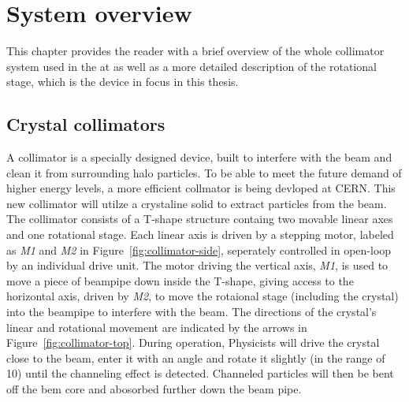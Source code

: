 \chapter{System overview}\label{cha:systemOverview}
This chapter provides the reader with a brief overview of the whole collimator system used in the \abbrLHC at \abbrCERN as well as a more detailed description of the rotational stage, which is the device in focus in this thesis.

\section{Crystal collimators}
A collimator is a specially designed device, built to interfere with the beam and clean it from surrounding halo particles. To be able to meet the future demand of higher energy levels, a more efficient collmator is being devloped at CERN. This new collimator will utilze a crystaline solid to extract particles from the beam. The collimator consists of a T-shape structure containg two movable linear axes and one rotational stage. Each linear axis is driven by a stepping motor, labeled as \emph{M1} and \emph{M2} in Figure~\ref{fig:collimator-side}, seperately controlled in open-loop by an individual drive unit. The motor driving the vertical axis, \emph{M1}, is used to move a piece of beampipe down inside the T-shape, giving access to the horizontal axis, driven by \emph{M2}, to move the rotaional stage (including the crystal) into the beampipe to interfere with the beam. The directions of the crystal's linear and rotational movement are indicated by the arrows in Figure~\ref{fig:collimator-top}.
During operation, Physicists will drive the crystal close to the beam, enter it with an angle and rotate it slightly (in the range of \unit{10}{\milli\rad}) until the channeling effect is detected. Channeled particles will then be bent off the bem core and abosorbed further down the beam pipe.


